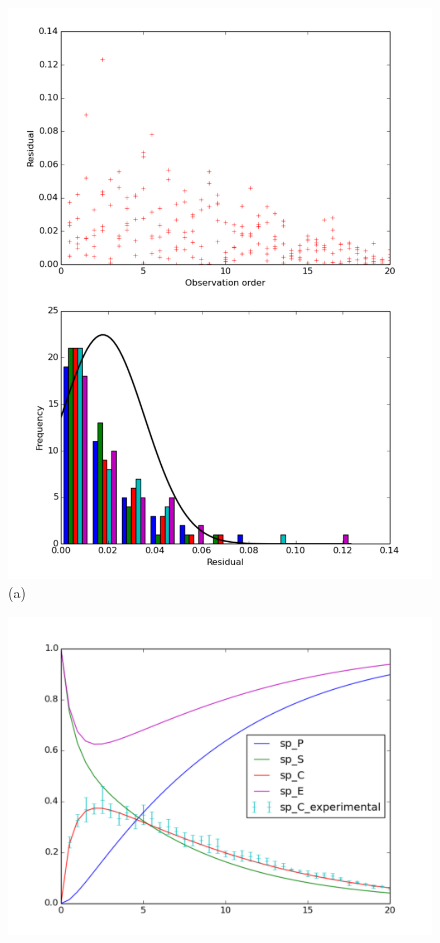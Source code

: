 \documentclass[17pt,portrait,a1,usenames,dvipsnames,plainboxedsections]{sciposter}
\begin{document}
\begin{multicols}{2}
\begin{figure}
\begin{center}
\begin{minipage}[c]{0.56\textwidth}
\centering
\includegraphics[width=\textwidth]{analysis_of_the_residuals.pdf}\\(a)
\end{minipage}\hfill
\begin{minipage}[c]{0.41\textwidth}
\centering
\includegraphics[width=\textwidth]{fitted_model.pdf}\\

\end{minipage}
\end{center}
\end{figure}
\end{multicols}
\end{document}
